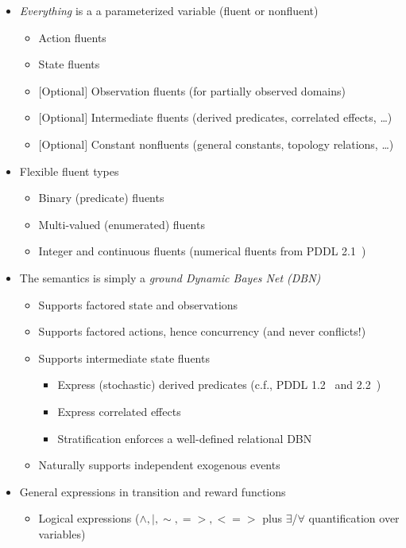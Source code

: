 \documentclass[11pt,a4paper]{article}
\begin{document}
\begin{itemize}
\item \emph{Everything} is a a parameterized variable (fluent or nonfluent)
  \begin{itemize}
    \item Action fluents 
    \item State fluents 
    \item $[$Optional$]$ Observation fluents (for partially observed domains)
    \item $[$Optional$]$ Intermediate fluents (derived predicates, correlated effects, \ldots)
    \item $[$Optional$]$ Constant nonfluents (general constants, topology relations, \ldots)
  \end{itemize}
\item Flexible fluent types
  \begin{itemize}
    \item Binary (predicate) fluents
    \item Multi-valued (enumerated) fluents
    \item Integer and continuous fluents (numerical fluents from PDDL 2.1~\cite{pddl21})
  \end{itemize}
\item The semantics is simply a \emph{ground Dynamic Bayes Net (DBN)}
  \begin{itemize}
    \item Supports factored state and observations
    \item Supports factored actions, hence concurrency (and never conflicts!)
    \item Supports intermediate state fluents
       \begin{itemize}
          \item Express (stochastic) derived predicates (c.f., PDDL 1.2~\cite{pddl12} and 2.2~\cite{pddl22})
          \item Express correlated effects
          \item Stratification enforces a well-defined relational DBN
       \end{itemize}
    \item Naturally supports independent exogenous events
  \end{itemize}
\item General expressions in transition and reward functions
  \begin{itemize}
    \item Logical expressions ($\land,|,\sim,=>,<=>$ plus $\exists$/$\forall$ quantification over variables)

\end{itemize}
\end{itemize}
\end{document}
